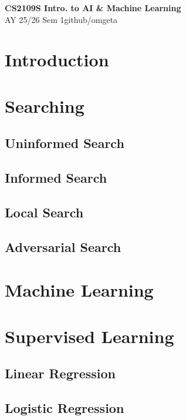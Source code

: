 \documentclass[12pt, a4paper]{article}
\newcommand{\mytitle}{CS2109S Intro. to AI \& Machine Learning}
\newcommand{\myauthor}{github/omgeta}
\newcommand{\mydate}{AY 25/26 Sem 1}
\begin{document}
\raggedright
\footnotesize
\begin{multicols*}{3}
\setlength{\premulticols}{1pt}
\setlength{\postmulticols}{1pt}
\setlength{\multicolsep}{1pt}
\setlength{\columnsep}{2pt}

{\normalsize{\textbf{\mytitle}}}\\
{\footnotesize{\mydate\hspace{2pt}\textemdash\hspace{2pt}\myauthor}}
\section{Introduction}

\section{Searching}
\subsection{Uninformed Search}
\subsection{Informed Search}
\subsection{Local Search}
\subsection{Adversarial Search}

\section{Machine Learning}

\section{Supervised Learning}
\subsection{Linear Regression}
\subsection{Logistic Regression}

\end{multicols*}
\end{document}
